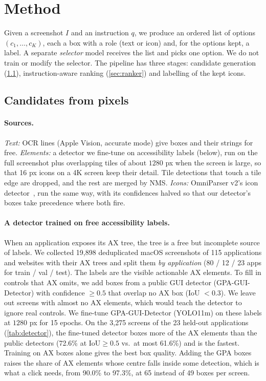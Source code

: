 \section{Method}
\label{sec:method}

Given a screenshot $I$ and an instruction $q$, we produce an ordered list of options
$(c_1,\dots,c_K)$, each a box with a role (text or icon) and, for the options kept, a label. A separate
\emph{selector} model receives the list and picks one option. We do not train or modify the selector.
The pipeline has three stages: candidate generation (\cref{sec:candidates}), instruction-aware ranking
(\cref{sec:ranker}) and labelling of the kept icons.

\subsection{Candidates from pixels}
\label{sec:candidates}

\paragraph{Sources.}
\emph{Text:} OCR lines (Apple Vision, accurate mode) give boxes and their strings for free.
\emph{Elements:} a detector we fine-tune on accessibility labels (below), run on the full screenshot plus
overlapping tiles of about $1280$ px when the screen is large, so that 16 px icons on a 4K screen keep their
detail. Tile detections that touch a tile edge are dropped, and the rest are merged by NMS.
\emph{Icons:} OmniParser v2's icon detector~\cite{lu2024omniparser}, run the same way, with its confidences
halved so that our detector's boxes take precedence where both fire.

\paragraph{A detector trained on free accessibility labels.}
When an application exposes its AX tree, the tree is a free but incomplete source of labels. We collected
19{,}898 deduplicated macOS screenshots of 115 applications and websites with their AX trees and split them
\emph{by application} (80 / 12 / 23 apps for train / val / test). The labels are the visible actionable AX
elements. To fill in controls that AX omits, we add boxes from a public GUI detector (GPA-GUI-Detector) with
confidence $\ge 0.5$ that overlap no AX box (IoU $<0.3$). We leave out screens with almost no AX elements, which
would teach the detector to ignore real controls. We fine-tune GPA-GUI-Detector (YOLO11m) on these labels at
$1280$ px for 15 epochs. On the 3{,}275 screens of the 23 held-out applications (\cref{tab:detector}), the
fine-tuned detector boxes more of the AX elements than the public detectors (72.6\% at IoU${\ge}0.5$ vs.\ at most
61.6\%) and is the fastest. Training on AX boxes alone gives the best box quality. Adding the GPA boxes raises the
share of AX elements whose centre falls inside some detection, which is what a click needs, from 90.0\% to 97.3\%,
at 65 instead of 49 boxes per screen.

